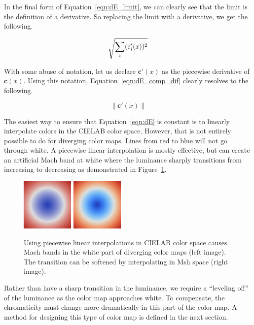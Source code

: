 \documentclass{acmsiggraph}               %
\newcommand{\Lab}{CIELAB\xspace}
\newcommand{\Msh}{Msh\xspace}
\newcommand*{\cvec}[1]{\mathbf{#1}}
\begin{document}
In the final form of Equation~\ref{eqn:dE_limit}, we can clearly see that
the limit is the definition of a derivative.  So replacing the limit with a
derivative, we get the following.

\begin{equation}
  \sqrtsign{\sum_i (\operatorname{c}_{i}'(x))^2}
  \label{eqn:dE_comp_dif}
\end{equation}

With some abuse of notation, let us declare $\cvec{c}'(x)$ as the piecewise
derivative of $\cvec{c}(x)$.  Using this notation,
Equation~\ref{eqn:dE_comp_dif} clearly resolves to the following.

\begin{equation}
  \left\lVert \cvec{c}'(x) \right\rVert
  \label{eqn:dE}
\end{equation}

The easiest way to ensure that Equation~\ref{eqn:dE} is constant
is to linearly interpolate colors in the \Lab color space.  However, that
is not entirely possible to do for diverging color maps.  Lines from red to
blue will not go through white.  A piecewise linear interpolation is mostly
effective, but can create an artificial Mach band at white where the
luminance sharply transitions from increasing to decreasing as demonstrated
in Figure~\ref{fig:LinearMachBands}.

\begin{figure}
  \centering
  \includegraphics[width=1in]{images/Cool2WarmLabRadial}
  \qquad
  \includegraphics[width=1in]{images/Cool2WarmRadial}
  \caption{Using piecewise linear interpolations in \Lab color space causes
    Mach bands in the white part of diverging color maps (left image).  The
    transition can be softened by interpolating in \Msh space (right image).}
  \label{fig:LinearMachBands}
\end{figure}

Rather than have a sharp transition in the luminance, we require a
``leveling off'' of the luminance as the color map approaches white.  To
compensate, the chromaticity must change more dramatically in this part of
the color map.  A method for designing this type of color map is defined in
the next section.
\end{document}
